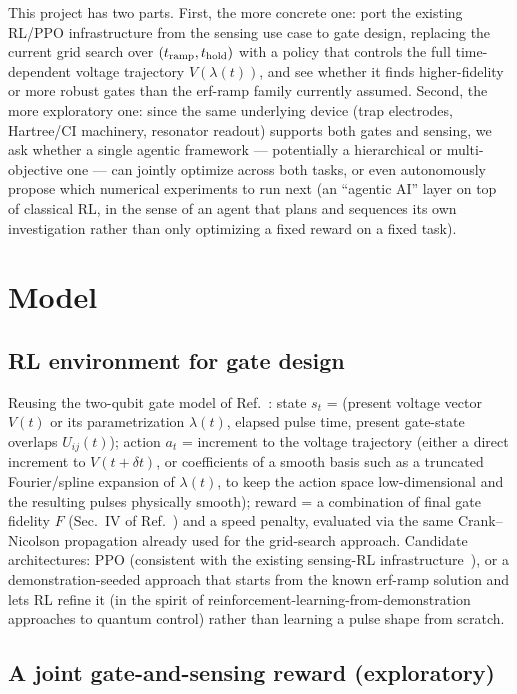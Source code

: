 \documentclass[aps,prapplied,reprint,superscriptaddress,longbibliography]{revtex4-2}
\begin{document}
This project has two parts. First, the more concrete one: port the existing RL/PPO infrastructure
from the sensing use case to gate design, replacing the current grid search over
$(t_{\rm ramp}, t_{\rm hold})$ with a policy that controls the full time-dependent voltage
trajectory $V(\lambda(t))$, and see whether it finds higher-fidelity or more robust gates than the
erf-ramp family currently assumed. Second, the more exploratory one: since the same underlying
device (trap electrodes, Hartree/CI machinery, resonator readout) supports both gates and sensing,
we ask whether a single agentic framework — potentially a hierarchical or multi-objective one — can
jointly optimize across both tasks, or even autonomously propose which numerical experiments to run
next (an ``agentic AI'' layer on top of classical RL, in the sense of an agent that plans and
sequences its own investigation rather than only optimizing a fixed reward on a fixed task).

\section{Model}

\subsection{RL environment for gate design}

Reusing the two-qubit gate model of Ref.~\cite{leinonen2025}: state $s_t$ = (present voltage vector
$V(t)$ or its parametrization $\lambda(t)$, elapsed pulse time, present gate-state overlaps
$U_{ij}(t)$); action $a_t$ = increment to the voltage trajectory (either a direct increment to
$V(t+\delta t)$, or coefficients of a smooth basis such as a truncated Fourier/spline expansion of
$\lambda(t)$, to keep the action space low-dimensional and the resulting pulses physically smooth);
reward = a combination of final gate fidelity $F$ (Sec.~IV of Ref.~\cite{leinonen2025}) and a speed
penalty, evaluated via the same Crank--Nicolson propagation already used for the grid-search
approach. Candidate architectures: PPO (consistent with the existing sensing-RL
infrastructure~\cite{schulman2017proximal}), or a demonstration-seeded approach that starts from the
known erf-ramp solution and lets RL refine it (in the spirit of reinforcement-learning-from-demonstration
approaches to quantum control) rather than learning a pulse shape from scratch.

\subsection{A joint gate-and-sensing reward (exploratory)}
\end{document}
